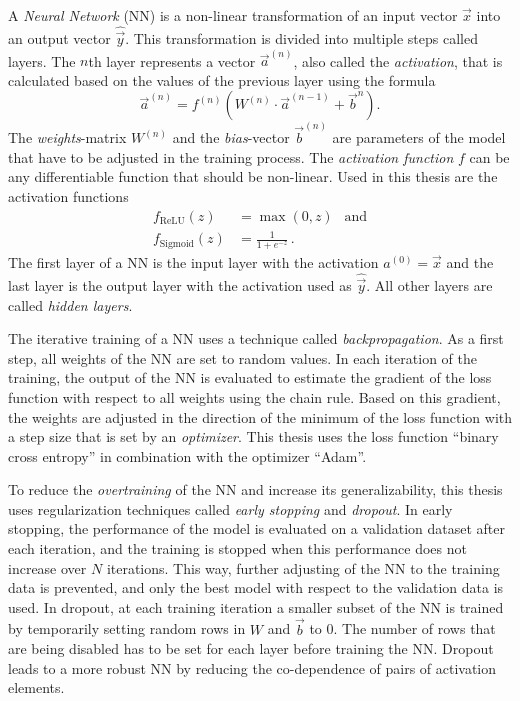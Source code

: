 
A \emph{Neural Network} (NN) is a non-linear transformation of an input vector $\vec{x}$ into an output vector $\hat{\vec{y}}$.
This transformation is divided into multiple steps called layers.
The $n$th layer represents a vector $\vec{a}^{(n)}$, also called the \emph{activation}, that is calculated based on the values of the previous layer using the formula
\begin{equation}
    \vec{a}^{(n)} = f^{(n)}\left( W^{(n)} \cdot \vec{a}^{(n-1)} + \vec{b}^{n} \right).
\end{equation}
The \emph{weights}-matrix $W^{(n)}$ and the \emph{bias}-vector $\vec{b}^{(n)}$ are parameters of the model that have to be adjusted in the training process.
The \emph{activation function} $f$ can be any differentiable function that should be non-linear.
Used in this thesis are the activation functions
\begin{align}
    f_\text{ReLU}(z) &= \max(0, z) \:\:\text{  and} \\
    f_\text{Sigmoid}(z) &= \frac{1}{1+e^{-z}} \, .
\end{align}
The first layer of a NN is the input layer with the activation $a^{(0)}=\vec{x}$ and the last layer is the output layer with the activation used as $\hat{\vec{y}}$.
All other layers are called \emph{hidden layers}.

The iterative training of a NN uses a technique called \emph{backpropagation}.
As a first step, all weights of the NN are set to random values.
In each iteration of the training, the output of the NN is evaluated to estimate the gradient of the loss function with respect to all weights using the chain rule.
Based on this gradient, the weights are adjusted in the direction of the minimum of the loss function with a step size that is set by an \emph{optimizer}.
This thesis uses the loss function \enquote{binary cross entropy} in combination with the optimizer \enquote{Adam}\cite{adam}.

To reduce the \emph{overtraining} of the NN and increase its generalizability, this thesis uses regularization techniques called \emph{early stopping} and \emph{dropout}.
In early stopping, the performance of the model is evaluated on a validation dataset after each iteration, and the training is stopped when this performance does not increase over $N$ iterations.
This way, further adjusting of the NN to the training data is prevented, and only the best model with respect to the validation data is used.
In dropout, at each training iteration a smaller subset of the NN is trained by temporarily setting random rows in $W$ and $\vec{b}$ to 0.
The number of rows that are being disabled has to be set for each layer before training the NN.
Dropout leads to a more robust NN by reducing the co-dependence of pairs of activation elements.


